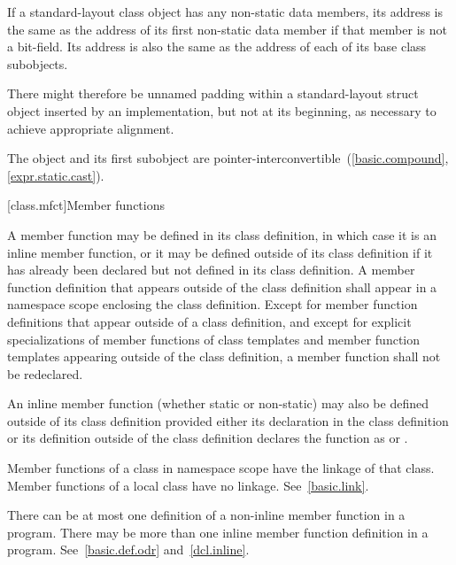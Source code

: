 \pnum
If a standard-layout class object has any non-static data members, its address
is the same as the address of its first non-static data member
if that member is not a bit-field. Its
address is also the same as the address of each of its base class subobjects.
\begin{note}
There might therefore be unnamed padding within a standard-layout struct object
inserted by an implementation, but
not at its beginning, as necessary to achieve appropriate alignment.
\end{note}
\begin{note}
The object and its first subobject are
pointer-interconvertible~(\ref{basic.compound}, \ref{expr.static.cast}).
\end{note}

[class.mfct]{Member functions}%

\pnum
{}%
%
A member function may be defined in its class
definition, in which case it is an inline member
function, or it may be defined outside of its class
definition if it has already been declared but not defined in its class
definition. A member function definition that appears outside of the
class definition shall appear in a namespace scope enclosing the class
definition. Except for member function definitions that appear outside
of a class definition, and except for explicit specializations of member
functions of class templates and member function
templates appearing outside of the class definition, a
member function shall not be redeclared.

\pnum
An inline member function (whether static or non-static) may
also be defined outside of its class definition provided either its
declaration in the class definition or its definition outside of the
class definition declares the function as  or .
\begin{note}
Member functions of a class in namespace scope have the linkage of that class.
Member functions of a local class have no linkage.
See~\ref{basic.link}.
\end{note}

\pnum
\begin{note}
There can be at most one definition of a non-inline member function in
a program. There may be more than one
inline member function definition in a program.
See~\ref{basic.def.odr} and~\ref{dcl.inline}.
\end{note}

